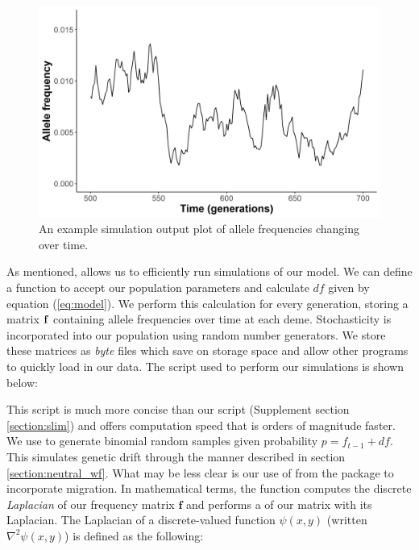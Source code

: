 \begin{figure}[H]
    \centering
    \includegraphics[scale=0.5]{img/time_series.jpg}
    \caption{An example simulation output plot of allele frequencies changing over time.}
    \label{fig:time_series}
\end{figure}


As mentioned,  allows us to efficiently run simulations of our model. We can define a  function to accept our population parameters and calculate $df$ given by equation (\ref{eq:model}). We perform this calculation for every generation, storing a matrix $\bf{f}$ containing allele frequencies over time at each deme. Stochasticity is incorporated into our population using  random number generators. We store these matrices as  \textit{byte} files which save on storage space and allow other  programs to quickly load in our data. The script used to perform our simulations is shown below:



This script is much more concise than our  script (Supplement section \ref{section:slim}) and offers computation speed that is orders of magnitude faster. We use  to generate binomial random samples given probability $p = f_{t-1} + df$. This simulates genetic drift through the manner described in section  \ref{section:neutral_wf}. What may be less clear is our use of  from the  package \cite{scipy} to incorporate migration. In mathematical terms, the  function computes the discrete \textit{Laplacian} of our frequency matrix $\textbf{f}$ and performs a  of our matrix with its Laplacian. The Laplacian of a discrete-valued function $\psi(x,y)$ (written $\nabla^2 \psi(x,y)$) is defined as the following:


